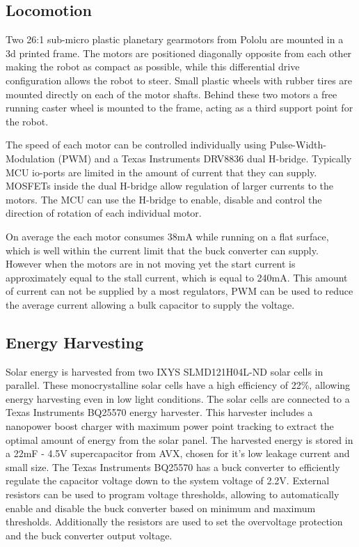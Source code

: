 \subsection{Locomotion}


Two 26:1 sub-micro plastic planetary gearmotors from Pololu are mounted in a 3d printed frame.
The motors are positioned diagonally opposite from each other making the robot as compact as possible, while this differential drive configuration allows the robot to steer.
Small plastic wheels with rubber tires are mounted directly on each of the motor shafts.
Behind these two motors a free running caster wheel is mounted to the frame, acting as a third support point for the robot.

The speed of each motor can be controlled individually using Pulse-Width-Modulation (PWM) and a Texas Instruments DRV8836 dual H-bridge.
Typically MCU io-ports are limited in the amount of current that they can supply.
MOSFETs inside the dual H-bridge allow regulation of larger currents to the motors.
The MCU can use the H-bridge to enable, disable and control the direction of rotation of each individual motor.


On average the each motor consumes 38mA while running on a flat surface, which is well within the current limit that the buck converter can supply.
However when the motors are in not moving yet the start current is approximately equal to the stall current, which is equal to 240mA.
This amount of current can not be supplied by a most regulators, PWM can be used to reduce the average current allowing a bulk capacitor to supply the voltage.

\subsection{Energy Harvesting}
\label{subsec:energy_harvesting}

Solar energy is harvested from two IXYS SLMD121H04L-ND solar cells in parallel.
These monocrystalline solar cells have a high efficiency of 22\%, allowing energy harvesting even in low light conditions.
The solar cells are connected to a Texas Instruments BQ25570 energy harvester. 
This harvester includes a nanopower boost charger with maximum power point tracking to extract the optimal amount of energy from the solar panel. 
The harvested energy is stored in a 22mF - 4.5V supercapacitor from AVX, chosen for it's low leakage current and small size.
The Texas Instruments BQ25570 has a buck converter to efficiently regulate the capacitor voltage down to the system voltage of 2.2V.
External resistors can be used to program voltage thresholds, allowing to automatically enable and disable the buck converter based on minimum and maximum thresholds.
Additionally the resistors are used to set the overvoltage protection and the buck converter output voltage.

